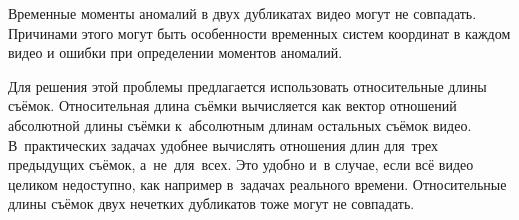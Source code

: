 \documentclass{.local/lib/classes/ndvr-super-article-standalone}
\begin{document}
    
    Временные моменты аномалий в двух дубликатах 
    видео могут не совпадать.
    Причинами этого могут быть особенности 
    временных систем координат в каждом видео и ошибки 
    при определении моментов аномалий.  

    Для решения этой проблемы предлагается 
    использовать относительные длины съёмок.
    Относительная длина съёмки вычисляется 
    как вектор отношений абсолютной длины
    съёмки к~абсолютным длинам остальных съёмок видео.
    В~практических задачах удобнее вычислять отношения длин
    для~трех предыдущих съёмок, а~не~для~всех.
    Это удобно и~в случае, если всё видео целиком недоступно,
    как например в~задачах реального времени.
    Относительные длины съёмок двух нечетких дубликатов 
    тоже могут не совпадать.
        
\end{document}
